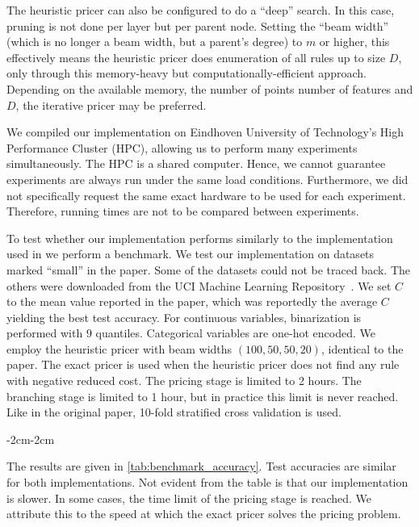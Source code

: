 The heuristic pricer can also be configured to do a ``deep'' search.
In this case, pruning is not done per layer but per parent node.
Setting the ``beam width'' (which is no longer a beam width, but a parent's degree) to $m$ or higher,
this effectively means the heuristic pricer does enumeration of all rules up to size $D$, only through this memory-heavy but computationally-efficient approach.
Depending on the available memory, the number of points number of features and $D$, the iterative pricer may be preferred.

We compiled our implementation on Eindhoven University of Technology's High Performance Cluster (HPC), allowing us to
perform many experiments simultaneously.
The HPC is a shared computer.
Hence, we cannot guarantee experiments are always run under the same load conditions.
Furthermore, we did not specifically request the same exact hardware to be used for each experiment.
Therefore, running times are not to be compared between experiments.

To test whether our implementation performs similarly to the implementation used in \cite{lawless_interpretable_2023}
we perform a benchmark.
We test our implementation on datasets marked ``small'' in the paper.
Some of the datasets could not be traced back.
The others were downloaded from the UCI Machine Learning Repository~\cite{kelly_markelle_uci_nodate}.
We set $C$ to the mean value reported in the paper, which was reportedly the average
$C$ yielding the best test accuracy.
For continuous variables, binarization is performed with $9$ quantiles.
Categorical variables are one-hot encoded.
We employ the heuristic pricer with beam widths $(100,50,50,20)$, identical to the paper.
The exact pricer is used when the heuristic pricer does not find any rule with negative reduced cost.
The pricing stage is limited to 2 hours.
The branching stage is limited to 1 hour, but in practice this limit is never reached.
Like in the original paper, 10-fold stratified cross validation is used.

\begin{adjustwidth}{-2cm}{-2cm}
\begin{table}[h]
    
    \caption{Results for the benchmark between our implementation and the implementation of \cite{lawless_conlawfaircg_2026}.
    Metrics are reported in ``[Mean] ([Standard deviation])'' format. ``Accuracy'' is abbreviated to ``Acc.''.}
    \label{tab:benchmark_accuracy}
\end{table}
\end{adjustwidth}

The results are given in \autoref{tab:benchmark_accuracy}.
Test accuracies are similar for both implementations.
Not evident from the table is that our implementation is slower.
In some cases, the time limit of the pricing stage is reached.
We attribute this to the speed at which the exact pricer solves the pricing problem.